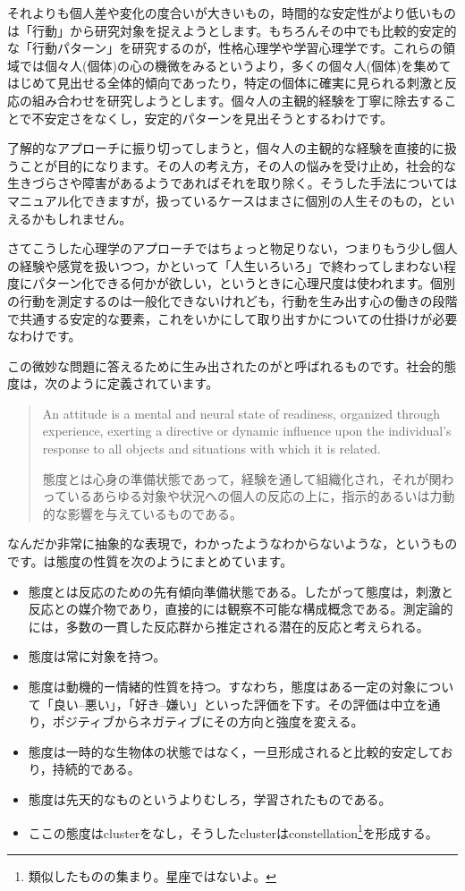 \documentclass{ltjsbook}
\begin{document}
それよりも個人差や変化の度合いが大きいもの，時間的な安定性がより低いものは「行動」から研究対象を捉えようとします。もちろんその中でも比較的安定的な「行動パターン」を研究するのが，性格心理学や学習心理学です。これらの領域では個々人(個体)の心の機微をみるというより，多くの個々人(個体)を集めてはじめて見出せる全体的傾向であったり，特定の個体に確実に見られる刺激と反応の組み合わせを研究しようとします。個々人の主観的経験を丁寧に除去することで不安定さをなくし，安定的パターンを見出そうとするわけです。

了解的なアプローチに振り切ってしまうと，個々人の主観的な経験を直接的に扱うことが目的になります。その人の考え方，その人の悩みを受け止め，社会的な生きづらさや障害があるようであればそれを取り除く。そうした手法についてはマニュアル化できますが，扱っているケースはまさに個別の人生そのもの，といえるかもしれません。

さてこうした心理学のアプローチではちょっと物足りない，つまりもう少し個人の経験や感覚を扱いつつ，かといって「人生いろいろ」で終わってしまわない程度にパターン化できる何かが欲しい，というときに心理尺度は使われます。個別の行動を測定するのは一般化できないけれども，行動を生み出す心の働きの段階で共通する安定的な要素，これをいかにして取り出すかについての仕掛けが必要なわけです。

この微妙な問題に答えるために生み出されたのがと呼ばれるものです。社会的態度は，次のように定義されています。

\begin{quote}
	An attitude is a mental and neural state of readiness, organized through experience, exerting a directive or dynamic influence upon the individual's response to all objects and situations with which it is related.

	態度とは心身の準備状態であって，経験を通して組織化され，それが関わっているあらゆる対象や状況への個人の反応の上に，指示的あるいは力動的な影響を与えているものである\parencite{Allport1935}。
\end{quote}

なんだか非常に抽象的な表現で，わかったようなわからないような，というものです。\textcite{Fujihara2001}は態度の性質を次のようにまとめています。

\begin{itemize}
	\item 態度とは反応のための先有傾向準備状態である。したがって態度は，刺激と反応との媒介物であり，直接的には観察不可能な構成概念である。測定論的には，多数の一貫した反応群から推定される潜在的反応と考えられる。
	\item 態度は常に対象を持つ。
	\item 態度は動機的ー情緒的性質を持つ。すなわち，態度はある一定の対象について「良い--悪い」，「好き--嫌い」といった評価を下す。その評価は中立を通り，ポジティブからネガティブにその方向と強度を変える。
	\item 態度は一時的な生物体の状態ではなく，一旦形成されると比較的安定しており，持続的である。
	\item 態度は先天的なものというよりむしろ，学習されたものである。
	\item ここの態度はclusterをなし，そうしたclusterはconstellation\footnote{類似したものの集まり。星座ではないよ。}を形成する。
\end{itemize}
\end{document}
